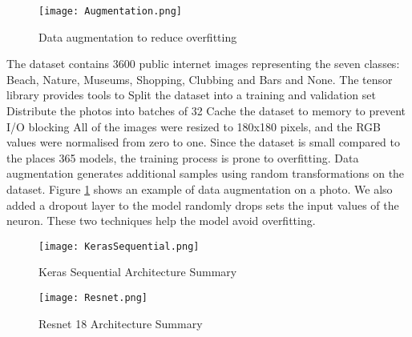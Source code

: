 \begin{figure}[h]
\centering
\texttt{[image: Augmentation.png]}
\caption{Data augmentation to reduce overfitting}
\label{Augmentation}
\end{figure}

The dataset contains 3600 public internet images
representing the seven classes: Beach, Nature,
Museums, Shopping, Clubbing and Bars and None. The
tensor library provides tools to Split the dataset
into a training and validation set Distribute the
photos into batches of 32 Cache the dataset to memory
to prevent I/O blocking All of the images were resized
to 180x180 pixels, and the RGB values were normalised
from zero to one.  	Since the dataset is small
compared to the places 365 models, the training
process is prone to overfitting. Data augmentation
generates additional samples using random
transformations on the dataset. Figure \ref{Augmentation} shows an
example of data augmentation on a photo. We also added
a dropout layer to the model randomly drops sets the
input values of the neuron. These two techniques help
the model avoid overfitting.


\begin{figure}[H]
  \centering
  \begin{minipage}[b]{0.4\textwidth}
    \texttt{[image: KerasSequential.png]}
    \caption{Keras Sequential Architecture Summary}
    \label{Keras}
  \end{minipage}
  \hfill
  \begin{minipage}[b]{0.4\textwidth}
\texttt{[image: Resnet.png]}
\caption{Resnet 18 Architecture Summary}
\label{Resnet}
  \end{minipage}
\end{figure}

